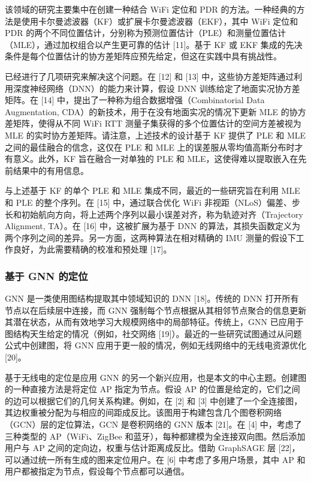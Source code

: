 \documentclass[journal]{IEEEtran}
\begin{document}
该领域的研究主要集中在创建一种结合 WiFi 定位和 PDR 的方法。一种经典的方法是使用卡尔曼滤波器（KF）或扩展卡尔曼滤波器（EKF），其中 WiFi 定位和 PDR 的两个不同位置估计，分别称为预测位置估计（PLE）和测量位置估计（MLE），通过加权组合以产生更可靠的估计 [11]。基于 KF 或 EKF 集成的先决条件是每个位置估计的协方差矩阵应预先给定，但这在实践中具有挑战性。

已经进行了几项研究来解决这个问题。在 [12] 和 [13] 中，这些协方差矩阵通过利用深度神经网络（DNN）的能力来计算，假设 DNN 训练给定了地面实况协方差矩阵。在 [14] 中，提出了一种称为组合数据增强（Combinatorial Data Augmentation, CDA）的新技术，用于在没有地面实况的情况下更新 MLE 的协方差矩阵，使得从不同 WiFi RTT 测量子集获得的多个位置估计的空间方差被视为 MLE 的实时协方差矩阵。请注意，上述技术的设计基于 KF 提供了 PLE 和 MLE 之间的最佳融合的信念，这仅在 PLE 和 MLE 上的误差服从零均值高斯分布时才有意义。此外，KF 旨在融合一对单独的 PLE 和 MLE，这使得难以提取嵌入在先前结果中的有用信息。

与上述基于 KF 的单个 PLE 和 MLE 集成不同，最近的一些研究旨在利用 MLE 和 PLE 的整个序列。在 [15] 中，通过联合优化 WiFi 非视距（NLoS）偏差、步长和初始航向方向，将上述两个序列以最小误差对齐，称为轨迹对齐（Trajectory Alignment, TA）。在 [16] 中，这被扩展为基于 DNN 的算法，其损失函数定义为两个序列之间的差异。另一方面，这两种算法在相对精确的 IMU 测量的假设下工作良好，为此需要精确的校准和预处理 [17]。

\subsubsection{基于 GNN 的定位}
GNN 是一类使用图结构提取其中领域知识的 DNN [18]。传统的 DNN 打开所有节点以在后续层中连接，而 GNN 强制每个节点根据从其相邻节点聚合的信息更新其潜在状态，从而有效地学习大规模网络中的局部特征。传统上，GNN 已应用于图结构天生给定的情况（例如，社交网络 [19]）。最近的一些研究试图通过从问题公式中创建图，将 GNN 应用于更一般的情况，例如无线网络中的无线电资源优化 [20]。

基于无线电的定位是应用 GNN 的另一个新兴应用，也是本文的中心主题。创建图的一种直接方法是将定位 AP 指定为节点。假设 AP 的位置是给定的，它们之间的边可以根据它们的几何关系构建。例如，在 [2] 和 [3] 中创建了一个全连接图，其边权重被分配为与相应的间距成反比。该图用于构建包含几个图卷积网络（GCN）层的定位算法，GCN 是卷积网络的 GNN 版本 [21]。在 [4] 中，考虑了三种类型的 AP（WiFi、ZigBee 和蓝牙），每种都建模为全连接双向图。然后添加用户与 AP 之间的定向边，权重与估计距离成反比。借助 GraphSAGE 层 [22]，可以通过统一所有生成的图来定位用户。在 [6] 中考虑了多用户场景，其中 AP 和用户都被指定为节点，假设每个节点都可以通信。
\end{document}
